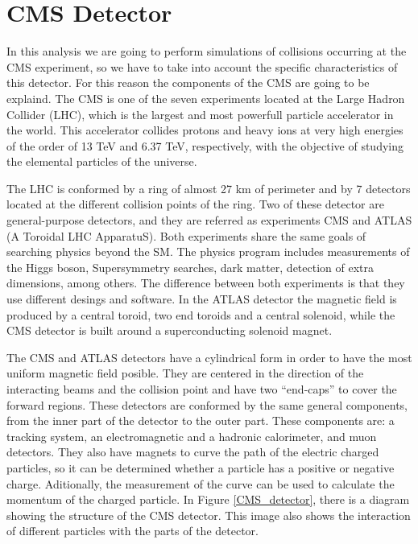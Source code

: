 \chapter{CMS Detector}
\label{CMS_chapter}

In this analysis we are going to perform simulations of collisions occurring at the CMS experiment, so we have to take into account the specific characteristics of this detector. For this reason
the components of the CMS are going to be explaind.
The CMS is one of the seven experiments located at the Large Hadron Collider (LHC), which is the largest and most powerfull particle accelerator in the world. This accelerator collides protons 
and heavy ions at very high energies of the order of 13 TeV and 6.37 TeV, respectively, with the objective of studying the elemental particles of the universe. 


The LHC is conformed by a ring of almost 27 km of perimeter and by 7 detectors located at the different collision points of the ring. Two of these detector are general-purpose detectors, and they 
are referred as experiments CMS and ATLAS (A Toroidal LHC ApparatuS). Both experiments share the same goals of searching physics beyond the SM. The physics program includes measurements of the Higgs boson, 
Supersymmetry searches, dark matter, detection of extra dimensions, among others. The difference between both experiments is that they use different desings and software. In the ATLAS detector the 
magnetic field is produced by a central toroid, two end toroids and a central solenoid, while the CMS detector is built around a superconducting solenoid magnet.  

The CMS and ATLAS detectors have a cylindrical form in order to have the most uniform magnetic field posible. They are centered in the direction of the interacting beams and the collision point and have two ``end-caps'' to cover the forward regions. These detectors are conformed by the same general components, from the inner part of the detector to the outer part. These components are: a tracking system, an electromagnetic and a hadronic calorimeter, and muon detectors. They also have magnets to curve the path of the electric charged particles, so it can be determined whether a particle has a positive or negative charge. Aditionally, the measurement of the curve can be used to calculate the momentum of the charged particle. In Figure \ref{CMS_detector}, there is a diagram showing the structure of the CMS detector. This image also shows the interaction of different particles with the parts of the detector.

